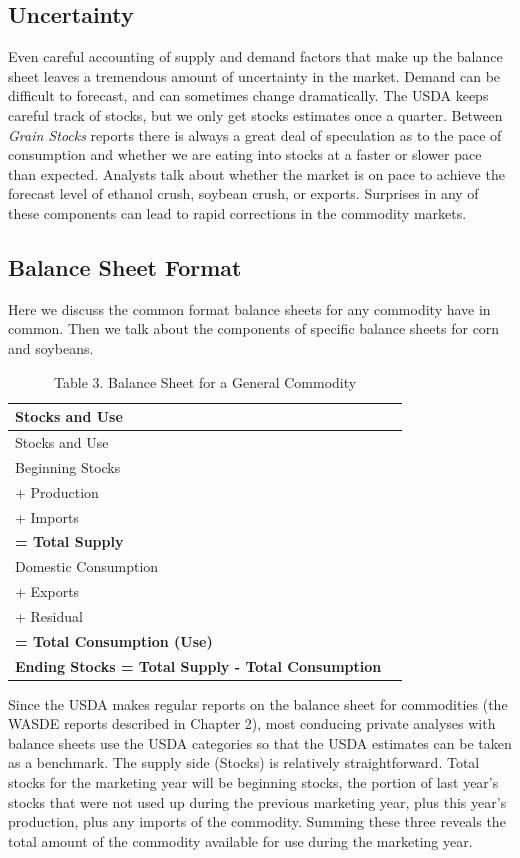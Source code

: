\documentclass[
]{book}
\begin{document}
\hypertarget{uncertainty}{%
\subsection{Uncertainty}\label{uncertainty}}

Even careful accounting of supply and demand factors that make up the balance sheet leaves a tremendous amount of uncertainty in the market. Demand can be difficult to forecast, and can sometimes change dramatically. The USDA keeps careful track of stocks, but we only get stocks estimates once a quarter. Between \emph{Grain Stocks} reports there is always a great deal of speculation as to the pace of consumption and whether we are eating into stocks at a faster or slower pace than expected. Analysts talk about whether the market is on pace to achieve the forecast level of ethanol crush, soybean crush, or exports. Surprises in any of these components can lead to rapid corrections in the commodity markets.

\hypertarget{balance-sheet-format}{%
\subsection{Balance Sheet Format}\label{balance-sheet-format}}

Here we discuss the common format balance sheets for any commodity have in common. Then we talk about the components of specific balance sheets for corn and soybeans.

\begin{longtable}[]{@{}ll@{}}
\caption{Table 3. Balance Sheet for a General Commodity}\tabularnewline
\toprule()
Stocks and Use & \\
\midrule()
\endfirsthead
\toprule()
Stocks and Use & \\
\midrule()
\endhead
Beginning Stocks & \\
+ Production & \\
+ Imports & \\
\textbf{= Total Supply} & \\
Domestic Consumption & \\
+ Exports & \\
+ Residual & \\
\textbf{= Total Consumption (Use)} & \\
\textbf{Ending Stocks = Total Supply - Total Consumption} & \\
\bottomrule()
\end{longtable}

Since the USDA makes regular reports on the balance sheet for commodities (the WASDE reports described in Chapter 2), most conducing private analyses with balance sheets use the USDA categories so that the USDA estimates can be taken as a benchmark. The supply side (Stocks) is relatively straightforward. Total stocks for the marketing year will be beginning stocks, the portion of last year's stocks that were not used up during the previous marketing year, plus this year's production, plus any imports of the commodity. Summing these three reveals the total amount of the commodity available for use during the marketing year.
\end{document}
